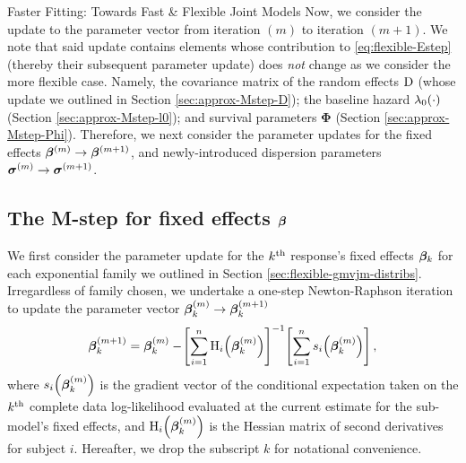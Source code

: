 \begin{chapter}{\label{cha:flexible}Faster Fitting: Towards Fast \& Flexible Joint Models}
Now, we consider the update to the parameter vector from iteration $(m)$ to iteration $(m+1)$. We note that said update contains elements whose contribution to \eqref{eq:flexible-Estep} (thereby their subsequent parameter update) does \textit{not} change as we consider the more flexible case. Namely, the covariance matrix of the random effects $\mathrm{D}$ (whose update we outlined in Section \ref{sec:approx-Mstep-D}); the baseline hazard $\lambda_0\!\left(\cdot\right)$ (Section \ref{sec:approx-Mstep-l0}); and survival parameters $\bm{\Phi}$ (Section \ref{sec:approx-Mstep-Phi}). Therefore, we next consider the parameter updates for the fixed effects $\bm{\beta}^{(m)}\rightarrow\bm{\beta}^{(m+1)}$, and newly-introduced dispersion parameters $\bm{\sigma}^{(m)}\rightarrow\bm{\sigma}^{(m+1)}$.

\subsection{The M-step for fixed effects \texorpdfstring{$\bm{\beta}$}{beta}}\label{sec:flexible-Mstep-fixef}
\rmtoc
We first consider the parameter update for the $k^{\text{th}}$ response's fixed effects $\bm{\beta}_k$ for each exponential family we outlined in Section \ref{sec:flexible-gmvjm-distribs}. Irregardless of family chosen, we undertake a one-step Newton-Raphson iteration to update the parameter vector $\bm{\beta}_k^{(m)}\rightarrow\bm{\beta}_k^{(m+1)}$ 
\begin{equation}
    \bm{\beta}_k^{(m+1)}=\bm{\beta}_k^{(m)}-\!\left[\sum_{i=1}^n\mathrm{H}_i\!\left(\bm{\beta}_k^{(m)}\right)\right]^{-1}\!\left[\sum_{i=1}^n s_i\!\left(\bm{\beta}_k^{(m)}\right)\right],
\label{eq:flexible-NRstep-beta}
\end{equation}
where $s_i\!\left(\bm{\beta}_k^{(m)}\right)$ is the gradient vector of the conditional expectation taken on the $k^{\text{th}}$ complete data log-likelihood evaluated at the current estimate for the sub-model's fixed effects, and $\mathrm{H}_i\!\left(\bm{\beta}_k^{(m)}\right)$ is the Hessian matrix of second derivatives for subject $i$. Hereafter, we drop the subscript $k$ for notational convenience.


\end{chapter}
